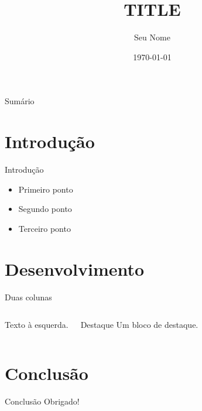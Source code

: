 \documentclass{beamer}
\title{{{TITLE}}}
\author{Seu Nome}
\institute{Sua Instituição}
\date{\today}
\begin{document}
\frame{\titlepage}

\begin{frame}{Sumário}
  \tableofcontents
\end{frame}

\section{Introdução}
\begin{frame}{Introdução}
  \begin{itemize}
    \item Primeiro ponto
    \item Segundo ponto
    \item Terceiro ponto
  \end{itemize}
\end{frame}

\section{Desenvolvimento}
\begin{frame}{Duas colunas}
  \begin{columns}
    Texto à esquerda.
    \begin{block}{Destaque}
      Um bloco de destaque.
    \end{block}
  \end{columns}
\end{frame}

\section{Conclusão}
\begin{frame}{Conclusão}
  Obrigado!
\end{frame}
\end{document}
